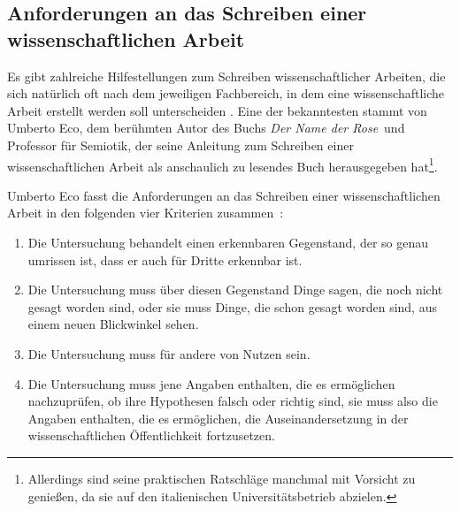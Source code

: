 \subsection{Anforderungen an das Schreiben einer wissenschaftlichen Arbeit}
Es gibt zahlreiche Hilfestellungen zum Schreiben wissenschaftlicher Arbeiten, die sich natürlich oft nach dem jeweiligen Fachbereich, in dem eine wissenschaftliche Arbeit erstellt werden soll unterscheiden \cite{Zobel:2004:WCS:993467, Evans:2014:WBT:2633585}.
Eine der bekanntesten stammt von Umberto Eco, dem berühmten Autor des Buchs \glqq \textit{Der Name der Rose}\grqq \ und Professor für Semiotik, der seine Anleitung zum Schreiben einer wissenschaftlichen Arbeit als anschaulich zu lesendes Buch herausgegeben hat\footnote{Allerdings sind seine praktischen Ratschläge manchmal mit Vorsicht zu genießen, da sie auf den italienischen Universitätsbetrieb abzielen.}.

\smallskip

Umberto Eco fasst die Anforderungen an das Schreiben einer wissenschaftlichen Arbeit in den folgenden vier Kriterien zusammen~\cite{Eco88}:
\begin{enumerate}
\item \glqq Die Untersuchung behandelt einen erkennbaren Gegenstand, der so genau umrissen ist, dass er auch für Dritte erkennbar ist.\grqq
\item \glqq  Die Untersuchung muss über diesen Gegenstand Dinge sagen, die noch nicht gesagt worden sind, oder sie muss Dinge, die schon gesagt worden sind, aus einem neuen Blickwinkel sehen.\grqq
\item \glqq Die Untersuchung muss für andere von Nutzen sein.\grqq
\item \glqq Die Untersuchung muss jene Angaben enthalten, die es ermöglichen nachzuprüfen, ob ihre Hypothesen falsch oder richtig sind, sie muss also die Angaben enthalten, die es ermöglichen, die Auseinandersetzung in der wissenschaftlichen Öffentlichkeit fortzusetzen.\grqq
\end{enumerate}